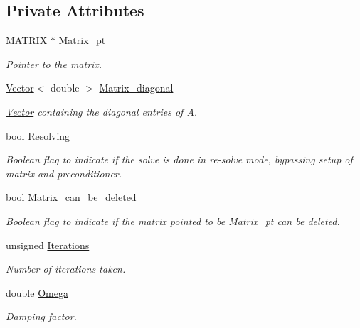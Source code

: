 \subsection*{Private Attributes}
\begin{DoxyCompactItemize}
\item 
M\+A\+T\+R\+IX $\ast$ \hyperlink{classoomph_1_1DampedJacobi_ad436c17f8b797ac05913955cac2df1d9}{Matrix\+\_\+pt}
\begin{DoxyCompactList}\small\item\em Pointer to the matrix. \end{DoxyCompactList}\item 
\hyperlink{classoomph_1_1Vector}{Vector}$<$ double $>$ \hyperlink{classoomph_1_1DampedJacobi_ac6474b25f5a309a19b417166951dfd31}{Matrix\+\_\+diagonal}
\begin{DoxyCompactList}\small\item\em \hyperlink{classoomph_1_1Vector}{Vector} containing the diagonal entries of A. \end{DoxyCompactList}\item 
bool \hyperlink{classoomph_1_1DampedJacobi_a096e652907b8451205f909e0277de284}{Resolving}
\begin{DoxyCompactList}\small\item\em Boolean flag to indicate if the solve is done in re-\/solve mode, bypassing setup of matrix and preconditioner. \end{DoxyCompactList}\item 
bool \hyperlink{classoomph_1_1DampedJacobi_a3f7d560d4c9566fe223de13a777f305d}{Matrix\+\_\+can\+\_\+be\+\_\+deleted}
\begin{DoxyCompactList}\small\item\em Boolean flag to indicate if the matrix pointed to be Matrix\+\_\+pt can be deleted. \end{DoxyCompactList}\item 
unsigned \hyperlink{classoomph_1_1DampedJacobi_a432acfaf14b05f8c5b25e62aede36f3c}{Iterations}
\begin{DoxyCompactList}\small\item\em Number of iterations taken. \end{DoxyCompactList}\item 
double \hyperlink{classoomph_1_1DampedJacobi_a7d53a703568479f387f19a5e40837889}{Omega}
\begin{DoxyCompactList}\small\item\em Damping factor. \end{DoxyCompactList}\end{DoxyCompactItemize}
